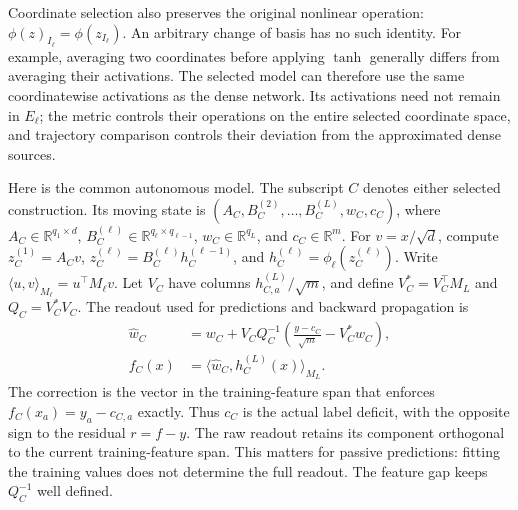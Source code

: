 Coordinate selection also preserves the original nonlinear operation:
$\phi(z)_{I_\ell}=\phi(z_{I_\ell})$. An arbitrary change of basis has
no such identity. For example, averaging two coordinates before applying
$\tanh$ generally differs from averaging their activations. The selected
model can therefore use the same coordinatewise activations as the dense
network. Its activations need not remain in $E_\ell$; the metric controls
their operations on the entire selected coordinate space, and trajectory
comparison controls their deviation from the approximated dense sources.

Here is the common autonomous model. The subscript $C$ denotes either
selected construction. Its moving state is
$(A_C,B_C^{(2)},\ldots,B_C^{(L)},w_C,c_C)$, where
$A_C\in\mathbb R^{q_1\times d}$,
$B_C^{(\ell)}\in\mathbb R^{q_\ell\times q_{\ell-1}}$,
$w_C\in\mathbb R^{q_L}$, and $c_C\in\mathbb R^m$.
For $v=x/\sqrt d$, compute
$z_C^{(1)}=A_Cv$, $z_C^{(\ell)}=B_C^{(\ell)}h_C^{(\ell-1)}$, and
$h_C^{(\ell)}=\phi_\ell(z_C^{(\ell)})$.
Write $\langle u,v\rangle_{M_\ell}=u^\top M_\ell v$.
Let $V_C$ have columns $h_{C,a}^{(L)}/\sqrt m$, and define
$V_C^*=V_C^\top M_L$ and $Q_C=V_C^*V_C$.
The readout used for predictions and backward propagation is
\begin{equation}
 \begin{aligned}
 \widehat w_C&=w_C+V_CQ_C^{-1}
 \left(\frac{y-c_C}{\sqrt m}-V_C^*w_C\right),\\
 f_C(x)&=\langle\widehat w_C,h_C^{(L)}(x)\rangle_{M_L}.
 \end{aligned}
 \label{eq:methods-corrected-readout}
\end{equation}
The correction is the vector in the training-feature span that enforces
$f_C(x_a)=y_a-c_{C,a}$ exactly. Thus $c_C$ is the actual label deficit,
with the opposite sign to the residual $r=f-y$. The raw readout retains
its component orthogonal to the current training-feature span. This matters
for passive predictions: fitting the training values does not determine
the full readout. The feature gap keeps $Q_C^{-1}$ well defined.

